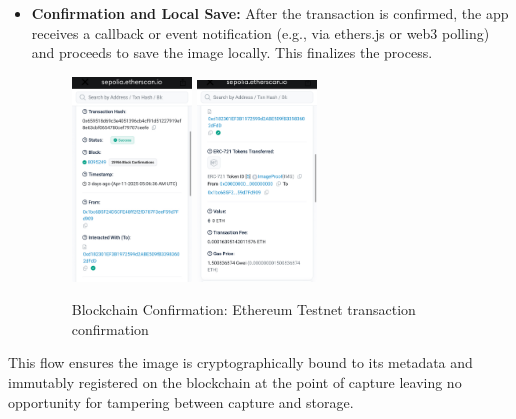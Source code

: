 \begin{itemize}
    \item {\textbf{Confirmation and Local Save:}} After the transaction is confirmed, the app receives a callback or event notification (e.g., via ethers.js or web3 polling) and proceeds to save the image locally. This finalizes the process. 
    \begin{figure}[H]
        \centering
        \includegraphics[width=0.30\textwidth]{images/etherTransactinConf1.jpeg}
        \includegraphics[width=0.30\textwidth]{images/etherTransactinConf2.jpeg}
        \caption{Blockchain Confirmation: Ethereum Testnet transaction confirmation}
        \label{fig:ethereuemConfirmation}
    \end{figure}
\end{itemize}

This flow ensures the image is cryptographically bound to its metadata and immutably registered on the blockchain at the point of capture leaving no opportunity for tampering between capture and storage.

